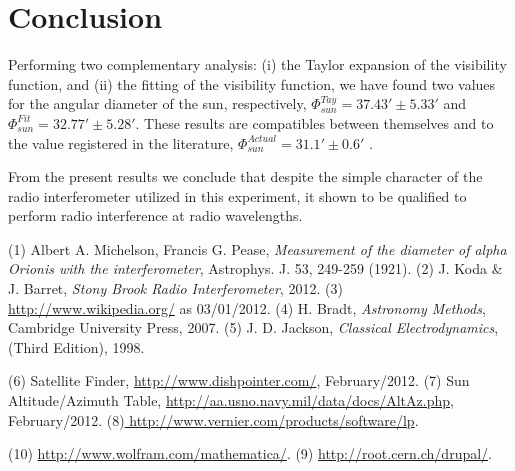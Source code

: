 \section{Conclusion}


Performing two complementary analysis: (i) the Taylor expansion of the visibility function, and (ii) the fitting of the visibility function, we have found  two values for the angular diameter of the sun, respectively,  $\Phi^{Tay}_{sun} = 37.43' \pm 5.33' $ and $\Phi^{Fit}_{sun}= 32.77' \pm 5.28'$. These results are compatibles between themselves and to the value registered in the literature,  $\Phi^{Actual}_{sun}= 31.1' \pm 0.6'$ \cite{wiki}. 

From the present results we  conclude that despite the simple character of the radio interferometer utilized in this experiment, it shown to be qualified to perform radio interference at radio wavelengths.



\begin{thebibliography}{2}

 (1) Albert A. Michelson, Francis G. Pease, {\it Measurement of the diameter of alpha Orionis with the interferometer}, Astrophys. J. 53, 249-259 (1921).
 (2) J. Koda \& J. Barret, {\it Stony Brook Radio Interferometer}, 2012.
 (3) \url{http://www.wikipedia.org/} as 03/01/2012.
 (4) H. Bradt, {\it Astronomy Methods}, Cambridge University Press, 2007.
 (5) J. D. Jackson, {\it Classical Electrodynamics}, (Third Edition), 1998. 


 (6) Satellite Finder, \url{http://www.dishpointer.com/}, February/2012.
 (7) Sun Altitude/Azimuth Table, \url{http://aa.usno.navy.mil/data/docs/AltAz.php}, February/2012.
 (8)\url{ http://www.vernier.com/products/software/lp}.

 (10) \url{ http://www.wolfram.com/mathematica/}.
 (9) \url{http://root.cern.ch/drupal/}.
\end{thebibliography}

\clearpage

